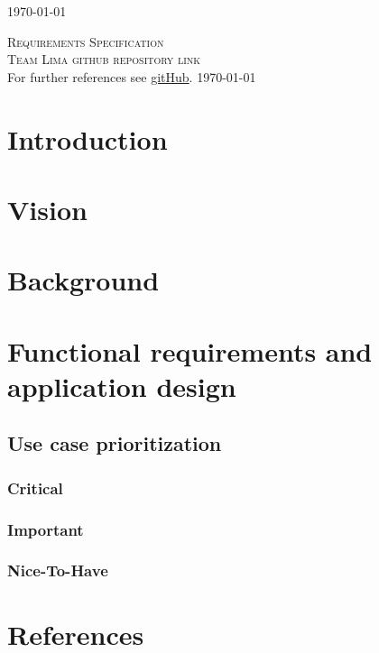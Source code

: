 \documentclass[a4paper,12pt]{report}
\begin{document}
\begin{titlepage}
\begin{center}
{\large \today}
\end{center}
\end{titlepage}
\footnotesize
\normalsize

\renewcommand{\thesection}{\arabic{section}}
\newpage
\begin{center}
\textsc{\LARGE Requirements Specification}\\[1.5cm]
\textsc{\Large Team Lima github repository link}\\[0.5cm]
For further references see \href{https://https://github.com/slugger7/team-lima}{gitHub}.
\today
\end{center}


\newpage
\section{Introduction}

\newpage
\section{Vision}

\newpage
\section{Background}

\newpage
\section{Functional requirements and application design}
\subsection{Use case prioritization}
\subsubsection{Critical}
\subsubsection{Important}
\subsubsection{Nice-To-Have}

\newpage
\section{References}
\end{document}
